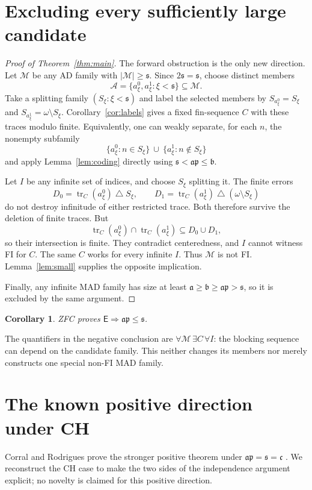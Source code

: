 \documentclass[11pt,letterpaper]{article}
\newtheorem{corollary}[theorem]{Corollary}
\theoremstyle{definition}
\theoremstyle{remark}
\newcommand{\s}{\mathfrak{s}}
\newcommand{\bnum}{\mathfrak{b}}
\newcommand{\anum}{\mathfrak{a}}
\newcommand{\ap}{\mathfrak{ap}}
\newcommand{\cont}{\mathfrak{c}}
\newcommand{\A}{\mathcal{A}}
\newcommand{\M}{\mathcal{M}}
\newcommand{\tr}{\operatorname{tr}}
\newcommand{\E}{\mathsf{E}}
\begin{document}
\section{Excluding every sufficiently large candidate}\label{sec:obstruction}
\begin{proof}[Proof of Theorem~\ref{thm:main}]
The forward obstruction is the only new direction. Let $\M$ be any AD
family with $|\M|\geq\s$. Since $2\s=\s$, choose distinct members
\[
 \A=\{a_\xi^0,a_\xi^1:\xi<\s\}\subseteq\M.
\]
Take a splitting family $(S_\xi:\xi<\s)$ and label the selected members by
$S_{a_\xi^0}=S_\xi$ and $S_{a_\xi^1}=\omega\setminus S_\xi$.
Corollary~\ref{cor:labels} gives a fixed fin-sequence $C$ with these traces
modulo finite. Equivalently, one can weakly separate, for each $n$, the
nonempty subfamily
\[
 \{a_\xi^0:n\in S_\xi\}\ \cup\ \{a_\xi^1:n\notin S_\xi\}
\]
and apply Lemma~\ref{lem:coding} directly using $\s<\ap\leq\bnum$.

Let $I$ be any infinite set of indices, and choose $S_\xi$ splitting it.
The finite errors
\[
 D_0=\tr_C(a_\xi^0)\mathbin\triangle S_\xi,\qquad
 D_1=\tr_C(a_\xi^1)\mathbin\triangle(\omega\setminus S_\xi)
\]
do not destroy infinitude of either restricted trace. Both therefore
survive the deletion of finite traces. But
\[
 \tr_C(a_\xi^0)\cap\tr_C(a_\xi^1)\subseteq D_0\cup D_1,
\]
so their intersection is finite. They contradict centeredness, and $I$
cannot witness FI for $C$. The same $C$ works for every infinite $I$.
Thus $\M$ is not FI. Lemma~\ref{lem:small} supplies the opposite implication.

Finally, any infinite MAD family has size at least $\anum\geq\bnum\geq\ap>\s$,
so it is excluded by the same argument.
\end{proof}

\begin{corollary}\label{cor:necessary}
ZFC proves $\E\Rightarrow\ap\leq\s$.
\end{corollary}
The quantifiers in the negative conclusion are $\forall\M\,\exists C\,\forall I$:
the blocking sequence can depend on the candidate family. This neither
changes its members nor merely constructs one special non-FI MAD family.

\section{The known positive direction under CH}\label{sec:ch}
Corral and Rodrigues prove the stronger positive theorem under
$\ap=\s=\cont$ \cite[Theorem~3.4]{CR}. We reconstruct the CH case to make
the two sides of the independence argument explicit; no novelty is claimed
for this positive direction.
\end{document}
